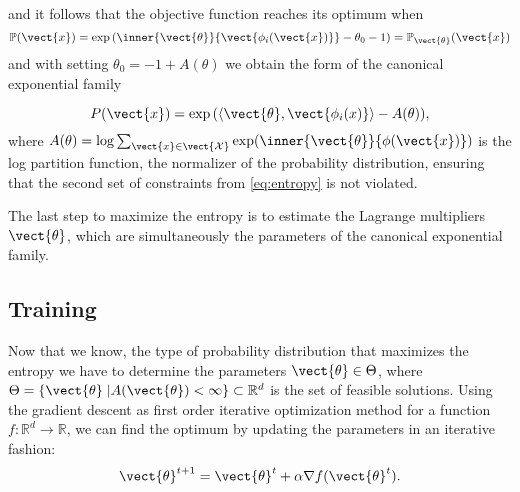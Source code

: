     and it follows that the objective function reaches its optimum when 
    \begin{equation}   
        \mathbb{P}(\vect{x}) = \exp{(\inner{\vect{\theta}}{\vect{\phi_i(\vect{x})}} - \theta_0 - 1)} = \mathbb{P}_{\vect{\theta}}(\vect{x})
    \end{equation} 
    and with setting $\theta_0 = -1 + A(\theta) $ we obtain the form of the canonical exponential family

    \begin{equation}
        P(\vect{x}) = \exp{(\langle\vect{\theta}, \vect{\phi_i(x)} \rangle - A(\theta))},
    \end{equation}
    where $A(\theta) = \log \sum_{\vect{x}\in \vect{\mathcal{X}}} \exp(\inner{\vect{\theta}}{\phi(\vect{x})})$ is the log partition function, the normalizer of the probability distribution, ensuring that the second set of constraints from \autoref{eq:entropy} is not violated.
    
    The last step to maximize the entropy is to estimate the Lagrange multipliers $\vect{\theta}$, which are simultaneously the parameters of the canonical exponential family.

    \subsection{Training}
    \label{ssec:train}

    Now that we know, the type of probability distribution that maximizes the entropy we have to determine the parameters $\vect{\theta} \in \Theta$, where $\Theta = \{\vect{\theta} \;\lvert A(\vect{\theta}) < \infty\} \subset \mathbb{R}^d$ is the set of feasible solutions.
    Using the gradient descent as first order iterative optimization method for a function $f: \mathbb{R}^d \rightarrow \mathbb{R}$, we can find the optimum by updating the parameters in an iterative fashion:
    \begin{equation}
        \label{eq:gradesc}
        \vect{\theta}^{t+1} = \vect{\theta}^{t} + \alpha \nabla f(\vect{\theta}^{t}).
    \end{equation}

